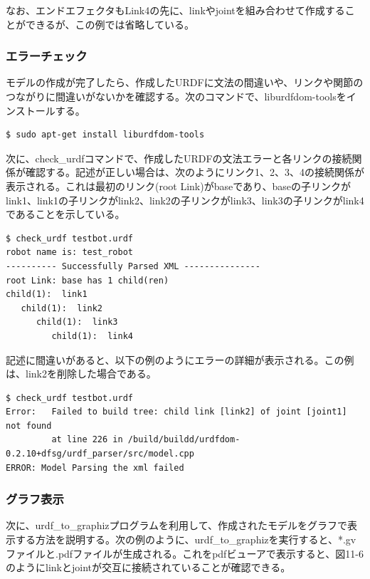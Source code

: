 なお、エンドエフェクタもLink4の先に、linkやjointを組み合わせて作成することができるが、この例では省略している。

\subsubsection{エラーチェック}

モデルの作成が完了したら、作成したURDFに文法の間違いや、リンクや関節のつながりに間違いがないかを確認する。次のコマンドで、liburdfdom-toolsをインストールする。

\begin{lstlisting}[language=ROS]
$ sudo apt-get install liburdfdom-tools
\end{lstlisting}

次に、check\_urdfコマンドで、作成したURDFの文法エラーと各リンクの接続関係が確認する。記述が正しい場合は、次のようにリンク1、2、3、4の接続関係が表示される。これは最初のリンク(root Link)がbaseであり、baseの子リンクがlink1、link1の子リンクがlink2、link2の子リンクがlink3、link3の子リンクがlink4であることを示している。

\begin{lstlisting}[language=ROS]
$ check_urdf testbot.urdf
robot name is: test_robot
---------- Successfully Parsed XML ---------------
root Link: base has 1 child(ren)
child(1):  link1
   child(1):  link2
      child(1):  link3
         child(1):  link4
\end{lstlisting}

記述に間違いがあると、以下の例のようにエラーの詳細が表示される。この例は、link2を削除した場合である。

\begin{lstlisting}[language=ROS]
$ check_urdf testbot.urdf
Error:   Failed to build tree: child link [link2] of joint [joint1] not found
         at line 226 in /build/buildd/urdfdom-0.2.10+dfsg/urdf_parser/src/model.cpp
ERROR: Model Parsing the xml failed
\end{lstlisting}

\subsubsection{グラフ表示}

次に、urdf\_to\_graphizプログラムを利用して、作成されたモデルをグラフで表示する方法を説明する。次の例のように、urdf\_to\_graphizを実行すると、*.gvファイルと.pdfファイルが生成される。これをpdfビューアで表示すると、図11-6のようにlinkとjointが交互に接続されていることが確認できる。

